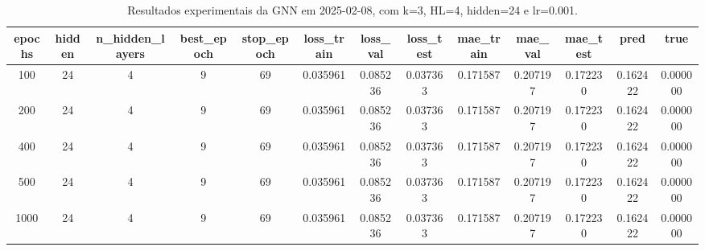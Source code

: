 \begin{table}[h]
\centering
\caption{Resultados experimentais da GNN em 2025-02-08, com k=3, HL=4, hidden=24 e lr=0.001.}
\label{tab:gnn_results_k3_hl4_h24_d20250208}
\begin{tabular}{ccccccccccccc}
\toprule
epochs & hidden & n\_hidden\_layers & best\_epoch & stop\_epoch & loss\_train & loss\_val & loss\_test & mae\_train & mae\_val & mae\_test & pred & true \\
\midrule
100 & 24 & 4 & 9 & 69 & 0.035961 & 0.085236 & 0.037363 & 0.171587 & 0.207197 & 0.172230 & 0.162422 & 0.000000 \\
200 & 24 & 4 & 9 & 69 & 0.035961 & 0.085236 & 0.037363 & 0.171587 & 0.207197 & 0.172230 & 0.162422 & 0.000000 \\
400 & 24 & 4 & 9 & 69 & 0.035961 & 0.085236 & 0.037363 & 0.171587 & 0.207197 & 0.172230 & 0.162422 & 0.000000 \\
500 & 24 & 4 & 9 & 69 & 0.035961 & 0.085236 & 0.037363 & 0.171587 & 0.207197 & 0.172230 & 0.162422 & 0.000000 \\
1000 & 24 & 4 & 9 & 69 & 0.035961 & 0.085236 & 0.037363 & 0.171587 & 0.207197 & 0.172230 & 0.162422 & 0.000000 \\
\bottomrule
\end{tabular}
\end{table}
